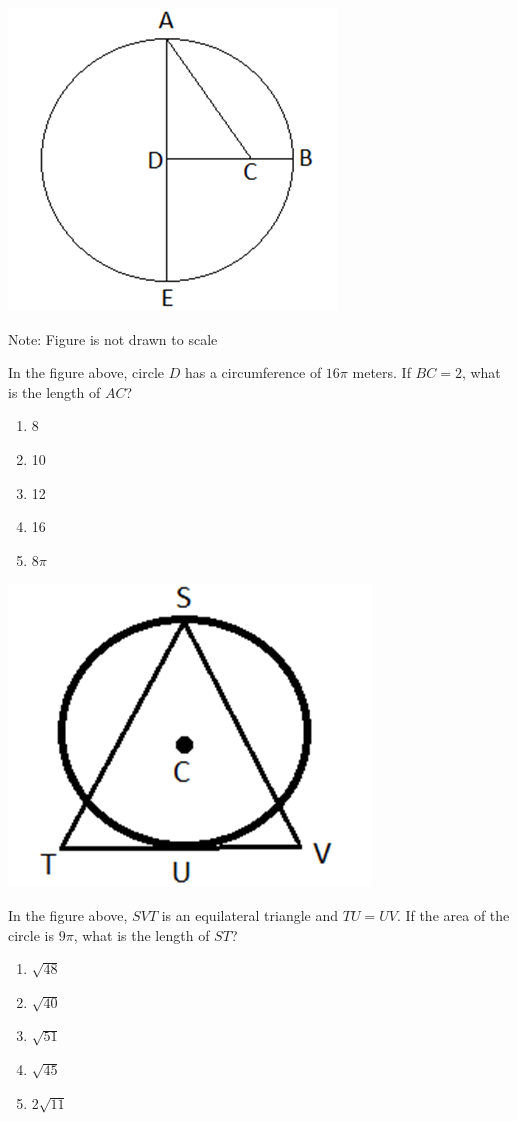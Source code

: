 \begin{multienumerate}
{\includegraphics{24}

Note: Figure is not drawn to scale

\bigskip
In the figure above, circle $D$ has a circumference of $16\pi$ meters. If $BC=2$, what is the length of $AC$?

\begin{enumerate}[label=(\Alph*)]
\item 8
\item 10
\item 12
\item 16
\item $8\pi$
\end{enumerate}
}{\advanced

\includegraphics{25}

In the figure above, $SVT$ is an equilateral triangle and $TU=UV$. If the area of the circle is $9\pi$, what is the length of $ST$?

\begin{enumerate}[label=(\Alph*)]
\item $\sqrt{48}$
\item $\sqrt{40}$
\item $\sqrt{51}$
\item $\sqrt{45}$
\item $2\sqrt{11}$
\end{enumerate}}
\end{multienumerate}

